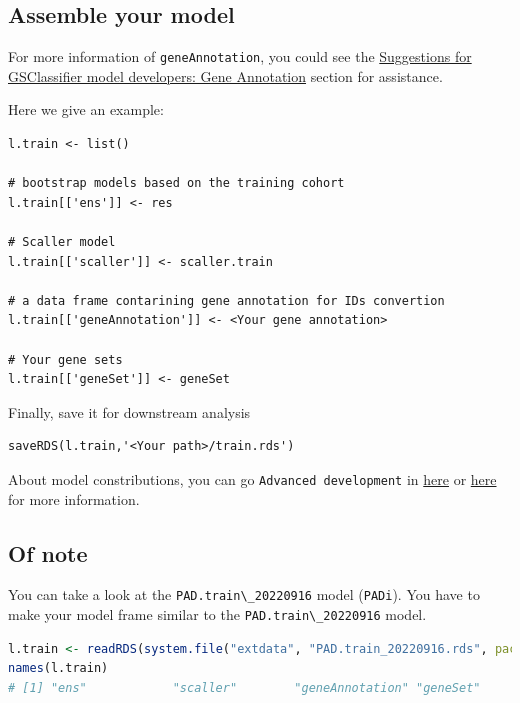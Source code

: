 \documentclass[
  12pt,
]{book}
\newcommand{\passthrough}[1]{#1}
\begin{document}
\hypertarget{assemble-your-model}{%
\subsection{Assemble your model}\label{assemble-your-model}}

For more information of \passthrough{\lstinline!geneAnnotation!}, you could see the \href{https://huangwb8.github.io/GSClassifier.principle/suggestions-for-gsclassifier-model-developers.html\#gene-annotation}{Suggestions for GSClassifier model developers: Gene Annotation} section for assistance.

Here we give an example:

\begin{lstlisting}
l.train <- list()

# bootstrap models based on the training cohort
l.train[['ens']] <- res 

# Scaller model
l.train[['scaller']] <- scaller.train 

# a data frame contarining gene annotation for IDs convertion
l.train[['geneAnnotation']] <- <Your gene annotation>

# Your gene sets
l.train[['geneSet']] <- geneSet
\end{lstlisting}

Finally, save it for downstream analysis

\begin{lstlisting}
saveRDS(l.train,'<Your path>/train.rds')
\end{lstlisting}

About model constributions, you can go \passthrough{\lstinline!Advanced development!} in \href{https://github.com/huangwb8/GSClassifier/wiki/Advanced-development}{here} or \href{http://htmlpreview.github.io/?https://raw.githubusercontent.com/wiki/huangwb8/GSClassifier/Advanced-development.html}{here} for more information.

\hypertarget{of-note-2}{%
\subsection{Of note}\label{of-note-2}}

You can take a look at the \passthrough{\lstinline!PAD.train\_20220916!} model (\passthrough{\lstinline!PADi!}). You have to make your model frame similar to the \passthrough{\lstinline!PAD.train\_20220916!} model.

\begin{lstlisting}[language=R]
l.train <- readRDS(system.file("extdata", "PAD.train_20220916.rds", package = "GSClassifier"))
names(l.train)
# [1] "ens"            "scaller"        "geneAnnotation" "geneSet"
\end{lstlisting}
\end{document}
